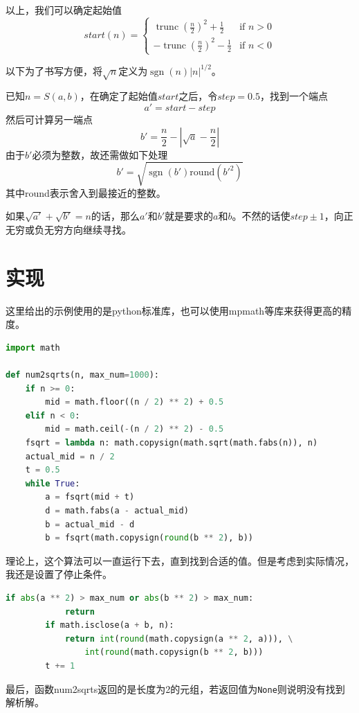 \documentclass[a4paper, UTF8]{ctexart}
\DeclareMathOperator{\sgn}{\mathrm{sgn}}
\DeclareMathOperator{\trunc}{\mathrm{trunc}}
\begin{document}
以上，我们可以确定起始值
\[
    start(n)=
    \begin{cases}
        \trunc(\frac{n}{2})^2+\frac{1}{2} & \text{if }n>0 \\
        -\trunc(\frac{n}{2})^2-\frac{1}{2} & \text{if }n<0
    \end{cases}
\]

以下为了书写方便，将$\sqrt{n}$定义为$\sgn(n)|n|^{1/2}$。

已知$n=S(a,b)$，在确定了起始值$start$之后，令$step=0.5$，找到一个端点\[a'=start-step\]然后可计算另一端点\[b'=\frac{n}{2}-|\sqrt{a}-\frac{n}{2}|\]由于$b'$必须为整数，故还需做如下处理\[b'=\sqrt{\sgn(b')\mathrm{round}(b'^2)}\]其中round表示舍入到最接近的整数。

如果$\sqrt{a'}+\sqrt{b'}=n$的话，那么$a'$和$b'$就是要求的$a$和$b$。不然的话使$step\pm1$，向正无穷或负无穷方向继续寻找。

\section{实现}
这里给出的示例使用的是python标准库，也可以使用mpmath等库来获得更高的精度。
\begin{lstlisting}[language=python, name=example]
import math

def num2sqrts(n, max_num=1000):
	if n >= 0:
        mid = math.floor((n / 2) ** 2) + 0.5
    elif n < 0:
        mid = math.ceil(-(n / 2) ** 2) - 0.5
    fsqrt = lambda n: math.copysign(math.sqrt(math.fabs(n)), n)
    actual_mid = n / 2
    t = 0.5
    while True:
        a = fsqrt(mid + t)
        d = math.fabs(a - actual_mid)
        b = actual_mid - d
        b = fsqrt(math.copysign(round(b ** 2), b))
\end{lstlisting}
理论上，这个算法可以一直运行下去，直到找到合适的值。但是考虑到实际情况，我还是设置了停止条件。
\begin{lstlisting}[language=python, name=example]
        if abs(a ** 2) > max_num or abs(b ** 2) > max_num:
            return
        if math.isclose(a + b, n):
            return int(round(math.copysign(a ** 2, a))), \
                int(round(math.copysign(b ** 2, b)))
        t += 1
\end{lstlisting}
最后，函数num2sqrts返回的是长度为2的元组，若返回值为\verb|None|则说明没有找到解析解。
\end{document}
